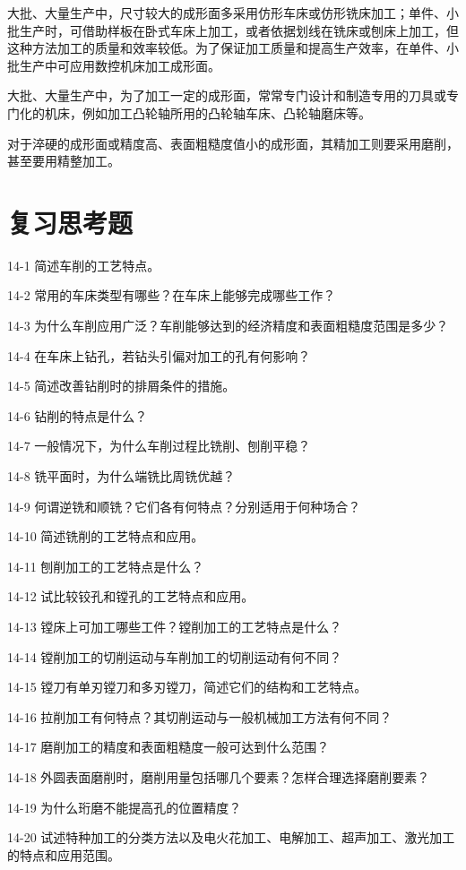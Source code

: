\documentclass[UTF8]{ctexbook}
\newcommand{\◎}{\ensuremath{\bigcirc}}
\begin{document}
大批、大量生产中，尺寸较大的成形面多采用仿形车床或仿形铣床加工；单件、小批生产时，可借助样板在卧式车床上加工，或者依据划线在铣床或刨床上加工，但这种方法加工的质量和效率较低。为了保证加工质量和提高生产效率，在单件、小批生产中可应用数控机床加工成形面。

大批、大量生产中，为了加工一定的成形面，常常专门设计和制造专用的刀具或专门化的机床，例如加工凸轮轴所用的凸轮轴车床、凸轮轴磨床等。

对于淬硬的成形面或精度高、表面粗糙度值小的成形面，其精加工则要采用磨削，甚至要用精整加工。

\section*{复习思考题}

 
14-1 简述车削的工艺特点。

14-2 常用的车床类型有哪些？在车床上能够完成哪些工作？

14-3 为什么车削应用广泛？车削能够达到的经济精度和表面粗糙度范围是多少？

14-4 在车床上钻孔，若钻头引偏对加工的孔有何影响？

14-5 简述改善钻削时的排屑条件的措施。

14-6 钻削的特点是什么？

14-7 一般情况下，为什么车削过程比铣削、刨削平稳？

14-8 铣平面时，为什么端铣比周铣优越？

14-9 何谓逆铣和顺铣？它们各有何特点？分别适用于何种场合？

14-10 简述铣削的工艺特点和应用。

14-11 刨削加工的工艺特点是什么？

14-12 试比较铰孔和镗孔的工艺特点和应用。

14-13 镗床上可加工哪些工件？镗削加工的工艺特点是什么？

14-14 镗削加工的切削运动与车削加工的切削运动有何不同？

14-15 镗刀有单刃镗刀和多刃镗刀，简述它们的结构和工艺特点。

14-16 拉削加工有何特点？其切削运动与一般机械加工方法有何不同？

14-17 磨削加工的精度和表面粗糙度一般可达到什么范围？

14-18 外圆表面磨削时，磨削用量包括哪几个要素？怎样合理选择磨削要素？

14-19 为什么珩磨不能提高孔的位置精度？

14-20 试述特种加工的分类方法以及电火花加工、电解加工、超声加工、激光加工的特点和应用范围。
\end{document}
